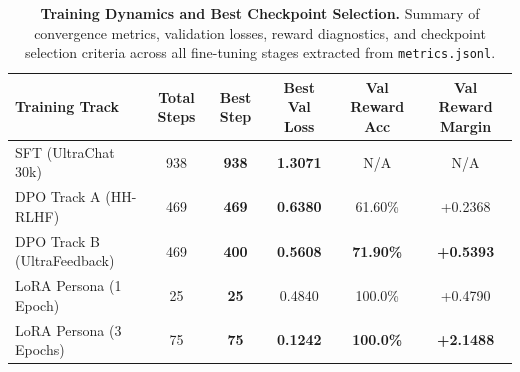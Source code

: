 \begin{table}[t]
\centering
\small
\caption{\textbf{Training Dynamics and Best Checkpoint Selection.} Summary of convergence metrics, validation losses, reward diagnostics, and checkpoint selection criteria across all fine-tuning stages extracted from \texttt{metrics.jsonl}.}
\label{tab:training_dynamics}
\begin{tabularx}{\columnwidth}{lccccc}
\toprule
\textbf{Training Track} & \textbf{Total Steps} & \textbf{Best Step} & \textbf{Best Val Loss} & \textbf{Val Reward Acc} & \textbf{Val Reward Margin} \\
\midrule
SFT (UltraChat 30k) & 938 & \textbf{938} & \textbf{1.3071} & N/A & N/A \\
DPO Track A (HH-RLHF) & 469 & \textbf{469} & \textbf{0.6380} & 61.60\% & +0.2368 \\
DPO Track B (UltraFeedback) & 469 & \textbf{400} & \textbf{0.5608} & \textbf{71.90\%} & \textbf{+0.5393} \\
LoRA Persona (1 Epoch) & 25 & \textbf{25} & 0.4840 & 100.0\% & +0.4790 \\
LoRA Persona (3 Epochs) & 75 & \textbf{75} & \textbf{0.1242} & \textbf{100.0\%} & \textbf{+2.1488} \\
\bottomrule
\end{tabularx}
\end{table}
